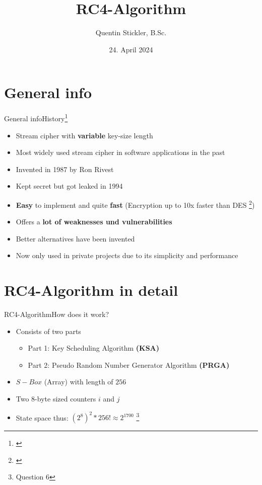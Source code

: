 \documentclass[
	aspectratio=169,	%
	onlytextwidth,		%
	t					%
	]{beamer}
\title[RC4-Algorithm]{RC4-Algorithm}
\author[Quentin Stickler]{Quentin Stickler, B.Sc.}
\date{24. April 2024} %
\begin{document}
\section{General info}
\begin{frame}[fragile]{General info}{History\footnote[frame]{\cite{stallings2005rc4}}}
	\begin{itemize}
		\item Stream cipher with \textbf{variable} key-size length
		\item Most widely used stream cipher in software applications in the past
		\item Invented in 1987 by Ron Rivest
		\item Kept secret but got leaked in 1994
		\item \textbf{Easy} to implement and quite \textbf{fast} (Encryption up to 10x faster than DES \footnote[frame]{\cite{stovsic2012rc4}})
		\item Offers a \textbf{lot of weaknesses und vulnerabilities}
		\item Better alternatives have been invented
		\item Now only used in private projects due to its simplicity and performance
	\end{itemize}
\end{frame}

\section{RC4-Algorithm in detail}

\begin{frame}[fragile]{RC4-Algorithm}{How does it work?}
	\begin{itemize}
		\item Consists of two parts
		\begin{itemize}
			\item Part 1: Key Scheduling Algorithm \textbf{(KSA)}
			\item Part 2: Pseudo Random Number Generator Algorithm \textbf{(PRGA)}
		\end{itemize}
		\item $S-Box$ (Array) with length of $256$
		\item Two 8-byte sized counters $i$ and $j$
		\item State space thus: $(2^{8})^2 * 256! \approx 2^{1700}$ \footnote[frame]{\footnotesize Question 6}
	\end{itemize}
\end{frame}
\end{document}
